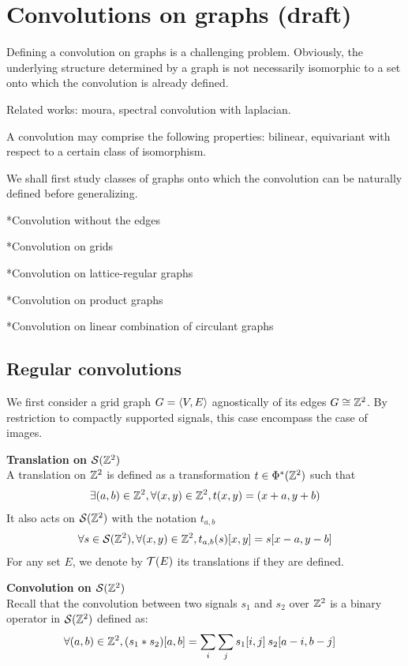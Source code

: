 \section{Convolutions on graphs (draft)}

Defining a convolution on graphs is a challenging problem. Obviously, the underlying structure determined by a graph is not necessarily isomorphic to a set onto which the convolution is already defined. 

Related works: moura, spectral convolution with laplacian.

A convolution may comprise the following properties: bilinear, equivariant with respect to a certain class of isomorphism.

We shall first study classes of graphs onto which the convolution can be naturally defined before generalizing.

*Convolution without the edges

*Convolution on grids

*Convolution on lattice-regular graphs

*Convolution on product graphs

*Convolution on linear combination of circulant graphs

\subsection{Regular convolutions}

We first consider a grid graph $\gve$ agnostically of its edges \ie $G \cong \bbz^2$. By restriction to compactly supported signals, this case encompass the case of images.

\begin{definition}\textbf{Translation on $\cs(\bbz^2)$}\\
A translation on $\bbz^2$ is defined as a transformation $t \in \Phi^*(\bbz^2)$ such that
\begin{gather*}
\exists (a,b) \in \bbz^2, \forall (x,y) \in \bbz^2, t(x,y) = (x+a,y+b)
\end{gather*}
It also acts on $\cs(\bbz^2)$ with the notation $t_{a,b}$ \ie
\begin{gather*}
\forall s \in \cs(\bbz^2), \forall (x,y) \in \bbz^2, t_{a,b}(s)[x,y] = s[x-a, y-b]
\end{gather*}
For any set $E$, we denote by $\ct(E)$ its translations if they are defined.
\end{definition}

\begin{definition}\textbf{Convolution on $\cs(\bbz^2)$}\\
Recall that the convolution between two signals $s_1$ and $s_2$ over $\bbz^2$ is a binary operator in $\cs(\bbz^2)$ defined as:
\begin{align*}
\forall (a,b) \in \bbz^2, (s_1 * s_2) [a,b] & = \displaystyle \sum_i \sum_j s_1[i,j] \h{2} s_2[a-i, b-j]
\end{align*}
\end{definition}

